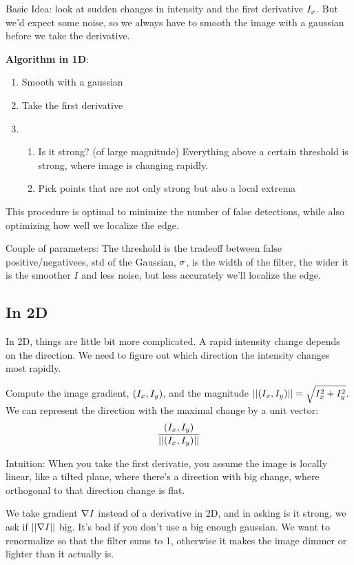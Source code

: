 Basic Idea: look at sudden changes in intensity and the first derivative $I_x$. 
But we'd expect some noise, so we always have to smooth the image with
a gaussian before we take the derivative.

\textbf{Algorithm in 1D}:
\begin{enumerate}
\item Smooth with a gaussian
\item Take the first derivative
\item 
  \begin{enumerate}
  \item Is it strong? (of large magnitude) Everything above a certain
    threshold is strong, where image is changing rapidly.
  \item Pick points that are not only strong but also a local extrema
  \end{enumerate}
\end{enumerate}

This procedure is optimal to minimize the number of false detections,
while also optimizing how well we localize the edge.

Couple of parameters: The threshold is the tradeoff between false
positive/negativees, std of the Gaussian, $\sigma$, is the width of the
filter, the wider it is the smoother $I$ and less noise, but less accurately we'll localize the edge.

\subsection{In 2D}
\label{sec:2d}
In 2D, things are little bit more complicated. A rapid intensity
change depends on the direction. We need to figure out which direction
the intensity changes  most rapidly.

Compute the image gradient, $(I_x, I_y)$, and the magnitude $||(I_x,
I_y)|| = \sqrt{I_x^2 + I_y^2}$. We can represent the direction with
the maximal change by a unit vector: 
\begin{equation}
  \label{eq:24}
\frac{(I_x, I_y)}{||(I_x, I_y)||}
\end{equation}

Intuition: When you take the first derivatie, you assume the image is
locally linear, like a tilted plane, where there's a direction with
big change, where orthogonal to that direction change is flat.

We take gradient $\nabla I$ instead of a derivative in 2D, and in
asking is it strong, we ask if $|| \nabla I||$ big. It's bad if you don't use a big enough gaussian. We want to
renormalize so that the filter sums to 1, otherwise it makes the image
dimmer or lighter than it actually is.

